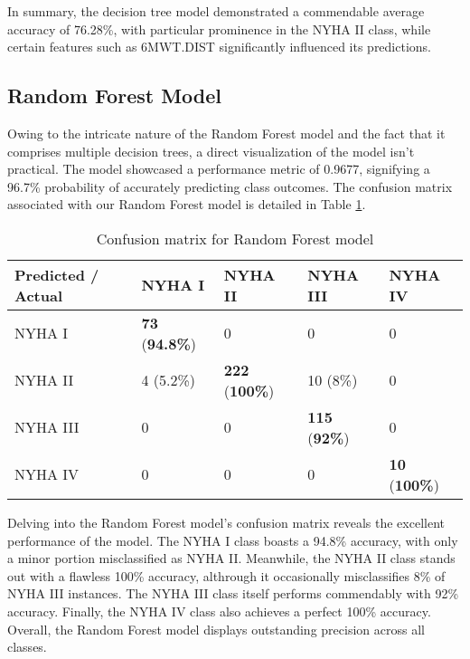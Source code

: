 In summary, the decision tree model demonstrated a commendable average accuracy of 76.28\%, with particular prominence in the NYHA II class, while certain features such as 6MWT.DIST significantly influenced its predictions.

\subsection{Random Forest Model}
\label{subsec:random_forest_model}

Owing to the intricate nature of the Random Forest model and the fact that it comprises multiple decision trees, a direct visualization of the model isn't practical. The model showcased a performance metric of 0.9677, signifying a 96.7\% probability of accurately predicting class outcomes. The confusion matrix associated with our Random Forest model is detailed in Table \ref{tab:random_forest_confusion_matrix}.

\begin{table}[H]
  \centering
  \caption{Confusion matrix for Random Forest model}
  \label{tab:random_forest_confusion_matrix}
  \begin{tabular}{|p{3.5cm}|p{2.5cm}|p{2.5cm}|p{2.2cm}|p{1.8cm}|}
  \hline
  Predicted / Actual          & NYHA I       & NYHA II      & NYHA III    & NYHA IV  \\ \hline
  NYHA I                      & \textbf{73} (\textbf{94.8\%}) & 0  & 0 & 0        \\ \hline
  NYHA II                     & 4 (5.2\%) & \textbf{222} (\textbf{100\%}) & 10 (8\%) & 0        \\ \hline
  NYHA III                    & 0  & 0  & \textbf{115} (\textbf{92\%}) & 0 \\ \hline
  NYHA IV                     & 0            & 0            & 0           & \textbf{10} (\textbf{100\%}) \\ \hline
  \end{tabular}
\end{table}

  Delving into the Random Forest model's confusion matrix reveals the excellent performance of the model. The NYHA I class boasts a 94.8\% accuracy, with only a minor portion misclassified as NYHA II. Meanwhile, the NYHA II class stands out with a flawless 100\% accuracy, althrough it occasionally misclassifies 8\% of NYHA III instances. The NYHA III class itself performs commendably with 92\% accuracy. Finally, the NYHA IV class also achieves a perfect 100\% accuracy. Overall, the Random Forest model displays outstanding precision across all classes. 

